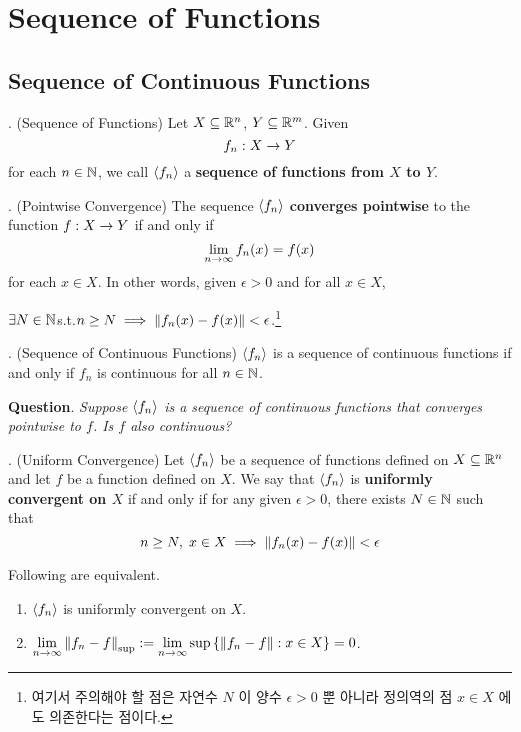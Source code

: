 \chapter{Sequence of Functions}

\section{Sequence of Continuous Functions}

. (Sequence of Functions) Let \(X \subseteq \mathbb{R}^n\), \(Y \subseteq \mathbb{R}^m\). Given
\[
    f_n: X\rightarrow Y
\]
for each \(n\in \mathbb{N}\), we call \(\left\langle f_n \right\rangle\) a \textbf{sequence of functions from \(X\) to \(Y\)}.

. (Pointwise Convergence) The sequence \(\left\langle f_n \right\rangle\) \textbf{converges pointwise} to the function \(f: X \rightarrow Y\) if and only if
\[
    \lim_{n\rightarrow \infty} f_n(x) = f(x)
\]
for each \(x \in X\). In other words, given \(\epsilon > 0\) and for all \(x \in X\),
\begin{center}
    \(\exists N\in \mathbb{N}\)\quad  s.t.\quad \(n \geq N \implies \left\lVert f_n(x) - f(x)\right\rVert < \epsilon\).\footnote{여기서 주의해야 할 점은 자연수 \(N\) 이 양수 \(\epsilon > 0\) 뿐 아니라 정의역의 점 \(x\in X\) 에도 의존한다는 점이다.}
\end{center}

. (Sequence of Continuous Functions) \(\left\langle f_n \right\rangle\) is a sequence of continuous functions if and only if \(f_n\) is continuous for all \(n\in \mathbb{N}\).

\textbf{Question}. \textit{Suppose \(\left\langle f_n \right\rangle\) is a sequence of continuous functions that converges pointwise to \(f\). Is \(f\) also continuous?}

. (Uniform Convergence) Let \(\left\langle f_n \right\rangle\) be a sequence of functions defined on \(X \subseteq \mathbb{R}^n\) and let \(f\) be a function defined on \(X\). We say that \(\left\langle f_n \right\rangle\) is \textbf{uniformly convergent on \(X\)} if and only if for any given \(\epsilon > 0\), there exists \(N\in \mathbb{N}\) such that
\[
    n\geq N,\; x\in X \implies \left\lVert f_n(x) - f(x)\right\rVert < \epsilon
\]

 Following are equivalent.
\begin{enumerate}
    \item \(\left\langle f_n \right\rangle\) is uniformly convergent on \(X\).
    \item \(\displaystyle \lim_{n\rightarrow\infty} \left\lVert f_n-f\right\rVert_{\sup} := \lim_{n\rightarrow \infty} \sup \left\{\left\lVert f_n-f\right\rVert: x\in X\right\} = 0\).
\end{enumerate}

